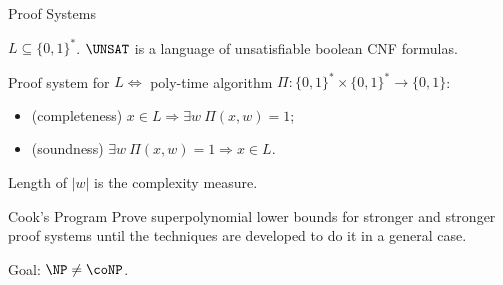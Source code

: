 \begin{frame}{Proof Systems}

	$L \subseteq \{0, 1\}^*$. $\UNSAT$ is a language of unsatisfiable boolean CNF formulas.
    \pause

    \begin{definition}
        Proof system for $L \Leftrightarrow$ poly-time algorithm
        $\Pi\colon \{0, 1\}^* \times \{0, 1\}^* \rightarrow \{0, 1\}$:
        \begin{itemize}
            \item (completeness) $x \in L \Rightarrow \exists w ~ \Pi(x, w) = 1$;
            \item (soundness) $\exists w ~ \Pi(x, w) = 1 \Rightarrow x \in L$.
        \end{itemize}
    \end{definition}

    Length of $|w|$ is the complexity measure.

    \pause

    \begin{block}{Cook's Program}
        Prove superpolynomial lower bounds for stronger and stronger proof systems until the techniques
        are developed to do it in a general case.

        Goal: $\NP \neq \coNP$.
    \end{block}
\end{frame}

